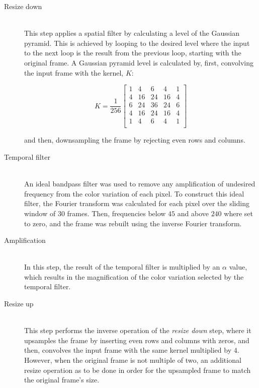 \begin{description}
  \item[Resize down]\hfill\\
        This step applies a spatial filter by calculating a level of the
        Gaussian pyramid. This is achieved by looping to the desired
        level where the input to the next loop is the result from the previous
        loop, starting with the original frame. A Gaussian pyramid level is
        calculated by, first, convolving the input frame with the kernel, $K$:

        \begin{equation}
          K = \frac{1}{256}
          \begin{bmatrix}
             1 &  4 &  6 &  4 &  1 \\
             4 & 16 & 24 & 16 &  4 \\
             6 & 24 & 36 & 24 &  6 \\
             4 & 16 & 24 & 16 &  4 \\
             1 &  4 &  6 &  4 &  1 \\
          \end{bmatrix}
        \end{equation}

        and then, downsampling the frame by rejecting even rows and columns.

  \item[Temporal filter]\hfill\\
        An ideal bandpass filter was used to remove any amplification of
        undesired frequency from the color variation of each pixel.
        To construct this ideal filter, the Fourier transform was calculated
        for each pixel over the sliding window of $30$ frames. Then,
        frequencies below $45$ and above $240$ where set to zero, and the frame
        was rebuilt using the inverse Fourier transform.

  \item[Amplification]\hfill\\
        In this step, the result of the temporal filter is multiplied by an
        $\alpha$ value, which results in the magnification of the color
        variation selected by the temporal filter.

  \item[Resize up]\hfill\\
        This step performs the inverse operation of the \emph{resize down} step,
        where it upsamples the frame by inserting even rows and columns with
        zeros, and then, convolves the input frame with the same kernel
        multiplied by $4$. However, when the original frame is not multiple of
        two, an additional resize operation as to be done in order for the
        upsampled frame to match the original frame's size.
\end{description}


